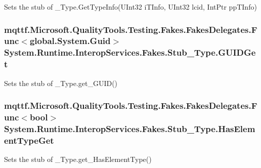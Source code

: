 Sets the stub of \-\_\-\-Type.\-Get\-Type\-Info(\-U\-Int32 i\-T\-Info, U\-Int32 lcid, Int\-Ptr pp\-T\-Info)

\hypertarget{class_system_1_1_runtime_1_1_interop_services_1_1_fakes_1_1_stub___type_a9dc904eb53ffab922dd77ddde830c7d4}{
\subsubsection[{G\-U\-I\-D\-Get}]{\setlength{\rightskip}{0pt plus 5cm}mqttf.\-Microsoft.\-Quality\-Tools.\-Testing.\-Fakes.\-Fakes\-Delegates.\-Func$<$global.\-System.\-Guid$>$ System.\-Runtime.\-Interop\-Services.\-Fakes.\-Stub\-\_\-\-Type.\-G\-U\-I\-D\-Get}}\label{class_system_1_1_runtime_1_1_interop_services_1_1_fakes_1_1_stub___type_a9dc904eb53ffab922dd77ddde830c7d4}


Sets the stub of \-\_\-\-Type.\-get\-\_\-\-G\-U\-I\-D()

\hypertarget{class_system_1_1_runtime_1_1_interop_services_1_1_fakes_1_1_stub___type_a7a024441e631daeb78211cb935aa093d}{
\subsubsection[{Has\-Element\-Type\-Get}]{\setlength{\rightskip}{0pt plus 5cm}mqttf.\-Microsoft.\-Quality\-Tools.\-Testing.\-Fakes.\-Fakes\-Delegates.\-Func$<$bool$>$ System.\-Runtime.\-Interop\-Services.\-Fakes.\-Stub\-\_\-\-Type.\-Has\-Element\-Type\-Get}}\label{class_system_1_1_runtime_1_1_interop_services_1_1_fakes_1_1_stub___type_a7a024441e631daeb78211cb935aa093d}


Sets the stub of \-\_\-\-Type.\-get\-\_\-\-Has\-Element\-Type()

